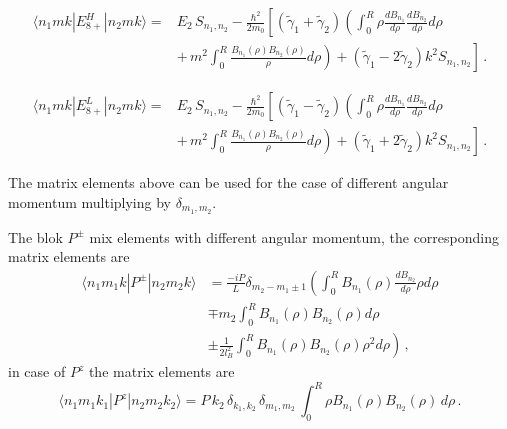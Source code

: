 \documentclass[12pt,a4paper]{article}
\begin{document}
\begin{equation}
\begin{split}
  \langle n_1 m k|E_{8+}^H|n_2 m k\rangle =& E_2\,S_{n_1, n_2} - \frac{\hbar^2}{2 m_0}
  \left[(\tilde{\gamma}_1+\tilde{\gamma}_2)\left(\int_0^{R} \rho \frac{d B_{n_1}}{d\rho}
  \frac{d B_{n_2}}{d\rho} d\rho\right.\right. \\
  &\left.\left.+\, m^2 \int_0^{R} \frac{B_{n_1}(\rho)B_{n_2}(\rho)}{\rho} d\rho\right) +
  (\tilde{\gamma}_1-2\tilde{\gamma}_2)k^2 S_{n_1,n_2} \right]\,.
\end{split}
\end{equation}

\begin{equation}
\begin{split}
  \langle n_1 m k|E_{8+}^L|n_2 m k\rangle =& E_2\,S_{n_1, n_2} - \frac{\hbar^2}{2 m_0}
  \left[(\tilde{\gamma}_1-\tilde{\gamma}_2)\left(\int_0^{R} \rho \frac{d B_{n_1}}{d\rho}
  \frac{d B_{n_2}}{d\rho} d\rho\right.\right. \\
  &\left.\left.+\, m^2 \int_0^{R} \frac{B_{n_1}(\rho)B_{n_2}(\rho)}{\rho} d\rho\right) +
  (\tilde{\gamma}_1+2\tilde{\gamma}_2)k^2 S_{n_1,n_2} \right]\,.
\end{split}
\end{equation}

\noindent
The matrix elements above can be used for the case of different angular momentum multiplying by $\delta_{m_1,m_2}$.

The blok $P^{\pm}$ mix elements with different angular momentum, the corresponding matrix elements are
\begin{equation}
\begin{split}
\langle n_1 m_1 k|P^{\pm}|n_2 m_2 k\rangle &= \frac{-i P}{L} \delta_{m_2-m_1\pm1} \left(
                                             \int_{0}^R B_{n_1}(\rho) \frac{d B_{n_2}}{d \rho}\rho d\rho \right.\\
                                           & \mp m_2 \int_{0}^R B_{n_1}(\rho) B_{n_2}(\rho) d\rho \\
                                           & \left.\pm \frac{1}{2l_B^2} \int_{0}^R B_{n_1}(\rho) B_{n_2}(\rho) \rho^2 d\rho \right)\,,
\end{split}
\end{equation}
\noindent
in case of $P^z$ the matrix elements are
\begin{equation}
\langle n_1 m_1 k_1|P^{z}|n_2 m_2 k_2\rangle = P\,k_2\,\delta_{k_1,k_2}\,\delta_{m_1,m_2}\,\int_0^R \rho B_{n_1}(\rho) B_{n_2}(\rho)\,d\rho\,.
\end{equation}
\end{document}
